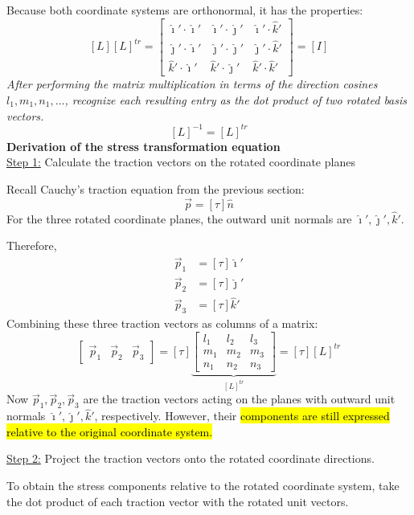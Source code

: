 ﻿\documentclass[12pt]{article}
\begin{document}
Because both coordinate systems are orthonormal, it has the properties:
\[
\boxed{[L][L]^{tr}=
\begin{bmatrix}
\hat{\imath}'\cdot\hat{\imath}'&
\hat{\imath}'\cdot\hat{\jmath}'&
\hat{\imath}'\cdot\hat{k}'\\
\hat{\jmath}'\cdot\hat{\imath}'&
\hat{\jmath}'\cdot\hat{\jmath}'&
\hat{\jmath}'\cdot\hat{k}'\\
\hat{k}'\cdot\hat{\imath}'&
\hat{k}'\cdot\hat{\jmath}'&
\hat{k}'\cdot\hat{k}'
\end{bmatrix}
=[I]}
\]
\textit{After performing the matrix multiplication in terms of the direction cosines $l_1, m_1, n_1, \ldots$, recognize each resulting entry as the dot product of two rotated basis vectors.}
\[
\boxed{[L]^{-1}=[L]^{tr}}
\]
\textbf{Derivation of the stress transformation equation}\\
\underline{Step 1:} Calculate the traction vectors on the rotated coordinate planes

Recall Cauchy's traction equation from the previous section:
\[
\vec p=[\tau]\hat n
\]
For the three rotated coordinate planes, the outward unit normals are
$\hat{\imath}', \hat{\jmath}', \hat{k}'$.

Therefore,
\[
\begin{aligned}
\vec p_1&=[\tau]\hat{\imath}'\\
\vec p_2&=[\tau]\hat{\jmath}'\\
\vec p_3&=[\tau]\hat{k}'
\end{aligned}
\]
Combining these three traction vectors as columns of a matrix:
\[
\begin{bmatrix}
\vec p_1&\vec p_2&\vec p_3
\end{bmatrix}
=[\tau]
\underbrace{
\begin{bmatrix}
l_1&l_2&l_3\\
m_1&m_2&m_3\\
n_1&n_2&n_3
\end{bmatrix}
}_{[L]^{tr}}
=[\tau][L]^{tr}
\]
Now \(\vec p_1,\vec p_2,\vec p_3\) are the traction vectors acting on the planes with outward unit normals \(\hat{\imath}',\hat{\jmath}',\hat{k}'\), respectively. However, their \hl{components are still expressed relative to the original coordinate system.}

\underline{Step 2:} Project the traction vectors onto the rotated coordinate directions.

To obtain the stress components relative to the rotated coordinate system, take the dot product of each traction vector with the rotated unit vectors.
\end{document}
